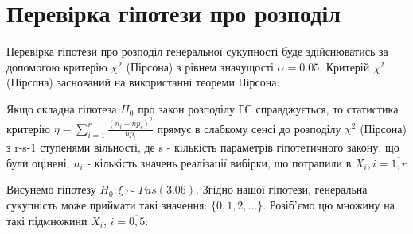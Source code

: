 \documentclass{article}
\begin{document}
\section{Перевірка гіпотези про розподіл}
Перевірка гіпотези про розподіл генеральної сукупності буде здійснюватись 
за допомогою критерію $\chi^2$ (Пірсона)  з рівнем значущості $\alpha = 0.05$.
\newline
Критерій $\chi^2$ (Пірсона) заснований на використанні теореми Пірсона:
\begin{theorem}[Пірсона]
  Якщо складна гіпотеза $H_0$ про закон розподілу ГС справджується, то 
  статистика критерію $\eta = \sum_{i=1}^r\frac{(n_i - np_i)^2}{np_i}$ 
  прямує в слабкому сенсі до розподілу $\chi^2$ (Пірсона) з r-s-1 
  ступенями вільності, де s - кількість параметрів гіпотетичного закону, 
  що були оцінені, $n_i$ - кількість значень реалізації вибірки, що потрапили в 
  $X_i, i = \overline{1, r}$

\end{theorem}
Висунемо гіпотезу $H_0: \xi \sim Pas(3.06)$. Згідно нашої гіпотези, 
генеральна сукупність може приймати такі значення: $\{0, 1, 2, \dots\}$.
Розіб'ємо цю множину на такі підмножини $X_i$, $i = \overline{0,5}$:
\end{document}
